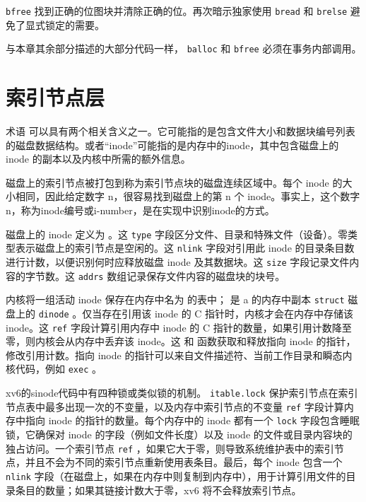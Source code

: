   \lstinline{bfree}   
        找到正确的位图块并清除正确的位。再次暗示独家使用
    \lstinline{bread}    和
    \lstinline{brelse}    避免了显式锁定的需要。  

与本章其余部分描述的大部分代码一样，
    \lstinline{balloc}    和
    \lstinline{bfree}    必须在事务内部调用。
    \section{索引节点层  }     

术语
        可以具有两个相关含义之一。它可能指的是包含文件大小和数据块编号列表的磁盘数据结构。或者“inode”可能指的是内存中的inode，其中包含磁盘上的inode 的副本以及内核中所需的额外信息。  

磁盘上的索引节点被打包到称为索引节点块的磁盘连续区域中。每个 inode 的大小相同，因此给定数字 n，很容易找到磁盘上的第 n 个 inode。事实上，这个数字n，称为inode编号或i-number，是在实现中识别inode的方式。  

磁盘上的 inode 定义为
        。这
    \lstinline{type}    字段区分文件、目录和特殊文件（设备）。零类型表示磁盘上的索引节点是空闲的。这
    \lstinline{nlink}    字段对引用此 inode 的目录条目数进行计数，以便识别何时应释放磁盘 inode 及其数据块。这
    \lstinline{size}   字段记录文件内容的字节数。这
    \lstinline{addrs}    数组记录保存文件内容的磁盘块的块号。  

内核将一组活动 inode 保存在内存中名为        的表中；
        是 a 的内存中副本
    \lstinline{struct}   
 磁盘上的    \lstinline{dinode}   。仅当存在引用该 inode 的 C 指针时，内核才会在内存中存储该 inode。这
    \lstinline{ref}    字段计算引用内存中 inode 的 C 指针的数量，如果引用计数降至零，则内核会从内存中丢弃该 inode。这
        和
        函数获取和释放指向 inode 的指针，修改引用计数。指向 inode 的指针可以来自文件描述符、当前工作目录和瞬态内核代码，例如
    \lstinline{exec}    。  

xv6的sinode代码中有四种锁或类似锁的机制。
    \lstinline{itable.lock}    保护索引节点在索引节点表中最多出现一次的不变量，以及内存中索引节点的不变量
    \lstinline{ref}    字段计算内存中指向 inode 的指针的数量。每个内存中的 inode 都有一个
    \lstinline{lock}    字段包含睡眠锁，它确保对 inode 的字段（例如文件长度）以及 inode 的文件或目录内容块的独占访问。一个索引节点
    \lstinline{ref}   ，如果它大于零，则导致系统维护表中的索引节点，并且不会为不同的索引节点重新使用表条目。最后，每个 inode 包含一个
    \lstinline{nlink}    字段（在磁盘上，如果在内存中则复制到内存中），用于计算引用文件的目录条目的数量；如果其链接计数大于零，xv6 将不会释放索引节点。  

